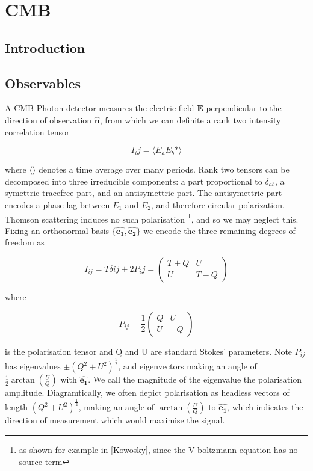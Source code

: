 \documentclass[a4paper,11pt]{article}
\renewcommand{\v}[1]{\mathbf{#1}}
\newcommand{\half}{\frac{1}{2}}
\newcommand{\unit}[1]{\hat{\v{#1}}}
\begin{document}
\section{CMB}

\subsection{Introduction}

\subsection{Observables}
A CMB Photon detector measures the electric field $\v{E}$ perpendicular to the direction of observation $\hat{\v{n}}$, from which we can definite a rank two intensity correlation tensor

\begin{equation}
I_ij = \langle E_aE_b* \rangle
\end{equation}

where $\langle\rangle$ denotes a time average over many periods. Rank two tensors can be decomposed into three irreducible components: a part proportional to $\delta_{ab}$, a symettric tracefree part, and an antisymettric part. The antisymettric part encodes a phase lag between $E_1$ and $E_2$, and therefore circular polarization. Thomson scattering induces no such polarisation \footnote{as shown for example in [Kowosky], since the V boltzmann equation has no source term}, and so we may neglect this. Fixing an orthonormal basis $\{\unit{e_1},\unit{e_2}\}$ we encode the three remaining degrees of freedom as 

\begin{equation}
I_{ij} = T\delta{ij}+2P_ij
=\begin{pmatrix}
T+Q & U\\ 
U & T-Q
\end{pmatrix}
\end{equation}

where 

\begin{equation}
P_{ij} =\half \begin{pmatrix}
Q & U\\ 
U & -Q
\end{pmatrix}
\end{equation}

is the polarisation tensor and Q and U are standard Stokes' parameters. Note $P_{ij}$ has eigenvalues $\pm (Q^2 + U^2)^\half$, and eigenvectors making an angle of $\half\arctan(\frac{U}{Q})$ with $\unit{e_1}$. We call the magnitude of the eigenvalue the polarisation amplitude. Diagramtically, we often depict polarisation as headless vectors of length $(Q^2 + U^2)^\half$, making an angle of $\arctan(\frac{U}{Q})$ to $\unit{e_1}$, which indicates the direction of measurement which would maximise the signal.
\end{document}
